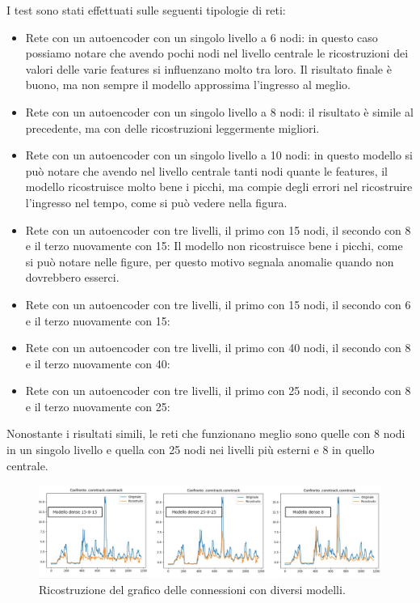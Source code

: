 I test sono stati effettuati sulle seguenti tipologie di reti:
\begin{itemize}
    \item Rete con un autoencoder con un singolo livello a 6 nodi: in questo caso possiamo notare che avendo pochi nodi nel livello centrale le ricostruzioni dei valori delle varie features si influenzano molto tra loro. Il risultato finale è buono, ma non sempre il modello approssima l'ingresso al meglio.
    \item Rete con un autoencoder con un singolo livello a 8 nodi: il risultato è simile al precedente, ma con delle ricostruzioni leggermente migliori.
    \item Rete con un autoencoder con un singolo livello a 10 nodi: in questo modello si può notare che avendo nel livello centrale tanti nodi quante le features, il modello ricostruisce molto bene i picchi, ma compie degli errori nel ricostruire l'ingresso nel tempo, come si può vedere nella figura.
    \item Rete con un autoencoder con tre livelli, il primo con 15 nodi, il secondo con 8 e il terzo nuovamente con 15: Il modello non ricostruisce bene i picchi, come si può notare nelle figure, per questo motivo segnala anomalie quando non dovrebbero esserci.
    \item Rete con un autoencoder con tre livelli, il primo con 15 nodi, il secondo con 6 e il terzo nuovamente con 15: %

    \item Rete con un autoencoder con tre livelli, il primo con 40 nodi, il secondo con 8 e il terzo nuovamente con 40:
    \item Rete con un autoencoder con tre livelli, il primo con 25 nodi, il secondo con 8 e il terzo nuovamente con 25:

\end{itemize}

Nonostante i risultati simili, le reti che funzionano meglio sono quelle con 8 nodi in un singolo livello e quella con 25 nodi nei livelli più esterni e 8 in quello centrale.

\begin{figure}[]
    \label{fig:reconstructions}
    \includegraphics[width=\hsize]{images/my_work/confronto_modelli.png}
    \caption{Ricostruzione del grafico delle connessioni con diversi modelli.}
    \centering
\end{figure}

